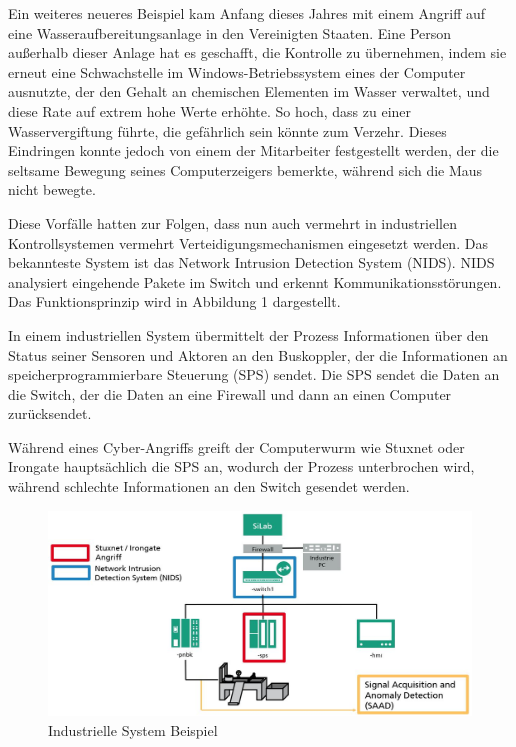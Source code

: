 \documentclass[12pt,a4paper]{scrartcl}
\numberwithin{equation}{section}
\begin{document}

Ein weiteres neueres Beispiel kam Anfang dieses Jahres mit einem Angriff auf eine Wasseraufbereitungsanlage\footnotemark{} in den Vereinigten Staaten. Eine Person außerhalb dieser Anlage hat es geschafft, die Kontrolle zu übernehmen, indem sie erneut eine Schwachstelle im Windows-Betriebssystem eines der Computer ausnutzte, der den Gehalt an chemischen Elementen im Wasser verwaltet, und diese Rate auf extrem hohe Werte erhöhte. So hoch, dass zu einer Wasservergiftung führte, die gefährlich sein könnte zum Verzehr. Dieses Eindringen konnte jedoch von einem der Mitarbeiter festgestellt werden, der die seltsame Bewegung seines Computerzeigers bemerkte, während sich die Maus nicht bewegte.


Diese Vorfälle hatten zur Folgen, dass nun auch vermehrt in industriellen Kontrollsystemen vermehrt Verteidigungsmechanismen eingesetzt werden. Das bekannteste System ist das Network Intrusion Detection System (NIDS). NIDS analysiert eingehende Pakete im Switch und erkennt Kommunikationsstörungen. Das Funktionsprinzip wird in Abbildung 1 dargestellt.

In einem industriellen System übermittelt der Prozess Informationen über den Status seiner Sensoren und Aktoren an den Buskoppler, der die Informationen an speicherprogrammierbare Steuerung (SPS) sendet. Die SPS sendet die Daten an die Switch, der die Daten an eine Firewall und dann an einen Computer zurücksendet.

Während eines Cyber-Angriffs greift der Computerwurm wie Stuxnet oder Irongate hauptsächlich die SPS an, wodurch der Prozess unterbrochen wird, während schlechte Informationen an den Switch gesendet werden. 

\begin{figure}[ht!]
	\centering
	  \includegraphics[scale=0.5]{ganze_systeme.jpg}
	  \caption{Industrielle System Beispiel}
\end{figure}
\end{document}
